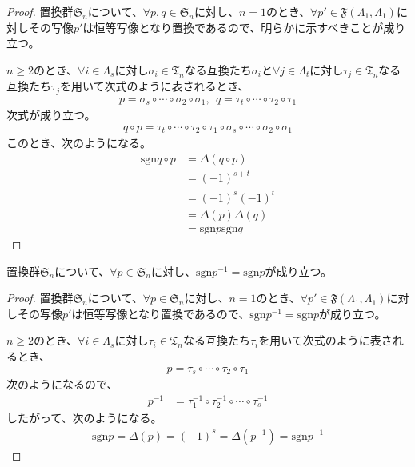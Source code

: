 \documentclass[dvipdfmx]{jsarticle}
\begin{document}
\begin{proof}
置換群$\mathfrak{S}_{n}$について、$\forall p,q \in \mathfrak{S}_{n}$に対し、$n = 1$のとき、$\forall p'\in \mathfrak{F}\left( \varLambda_{1},\varLambda_{1} \right)$に対しその写像$p'$は恒等写像となり置換であるので、明らかに示すべきことが成り立つ。\par
$n \geq 2$のとき、$\forall i \in \varLambda_{s}$に対し$\sigma_{i} \in \mathfrak{T}_{n}$なる互換たち$\sigma_{i}$と$\forall j \in \varLambda_{t}$に対し$\tau_{j} \in \mathfrak{T}_{n}$なる互換たち$\tau_{j}$を用いて次式のように表されるとき、
\begin{align*}
p = \sigma_{s} \circ \cdots \circ \sigma_{2} \circ \sigma_{1},\ \ q = \tau_{t} \circ \cdots \circ \tau_{2} \circ \tau_{1}
\end{align*}
次式が成り立つ。
\begin{align*}
q \circ p = \tau_{t} \circ \cdots \circ \tau_{2} \circ \tau_{1} \circ \sigma_{s} \circ \cdots \circ \sigma_{2} \circ \sigma_{1}
\end{align*}
このとき、次のようになる。
\begin{align*}
{\mathrm{sgn} }{q \circ p} &= \varDelta(q \circ p)\\
&= ( - 1)^{s + t}\\
&= ( - 1)^{s}( - 1)^{t}\\
&= \varDelta(p)\varDelta(q)\\
&= {\mathrm{sgn} }p{\mathrm{sgn} }q
\end{align*}
\end{proof}
\begin{thm}\label{2.1.10.8}
置換群$\mathfrak{S}_{n}$について、$\forall p \in \mathfrak{S}_{n}$に対し、${\mathrm{sgn} }p^{- 1} = {\mathrm{sgn} }p$が成り立つ。
\end{thm}
\begin{proof}
置換群$\mathfrak{S}_{n}$について、$\forall p \in \mathfrak{S}_{n}$に対し、$n = 1$のとき、$\forall p'\in \mathfrak{F}\left( \varLambda_{1},\varLambda_{1} \right)$に対しその写像$p'$は恒等写像となり置換であるので、${\mathrm{sgn} }p^{- 1} = {\mathrm{sgn} }p$が成り立つ。\par
$n \geq 2$のとき、$\forall i \in \varLambda_{s}$に対し$\tau_{i} \in \mathfrak{T}_{n}$なる互換たち$\tau_{i}$を用いて次式のように表されるとき、
\begin{align*}
p = \tau_{s} \circ \cdots \circ \tau_{2} \circ \tau_{1} 
\end{align*}
次のようになるので、
\begin{align*}
p^{- 1} &= \tau_{1}^{- 1} \circ \tau_{2}^{- 1} \circ \cdots \circ \tau_{s}^{- 1}
\end{align*}
したがって、次のようになる。
\begin{align*}
{\mathrm{sgn} }p = \varDelta(p) = ( - 1)^{s} = \varDelta\left( p^{- 1} \right) = {\mathrm{sgn} }p^{- 1}
\end{align*}
\end{proof}
\end{document}
